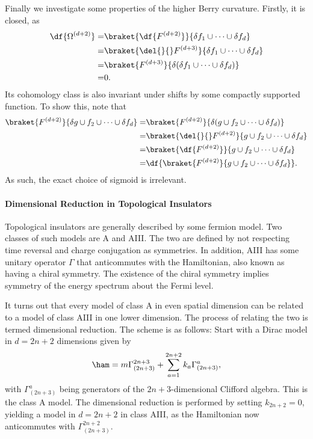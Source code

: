 Finally we investigate some properties of the higher Berry curvature. Firstly, it is closed, as
\begin{align*}
	\df{\Omega^{(d + 2)}} =& \braket{\df{F^{(d + 2)}}}{\delta f_{1}\cup\dots\cup\delta f_{d}} \\
	                      =& \braket{\del{}{}F^{(d + 3)}}{\delta f_{1}\cup\dots\cup\delta f_{d}} \\
	                      =& \braket{F^{(d + 3)}}{\delta(\delta f_{1}\cup\dots\cup\delta f_{d})} \\
	                      =& 0.
\end{align*}
Its cohomology class is also invariant under shifts by some compactly supported function. To show this, note that
\begin{align*}
	\braket{F^{(d + 2)}}{\delta g\cup f_{2}\cup\dots\cup\delta f_{d}} =& \braket{F^{(d + 2)}}{\delta(g\cup f_{2}\cup\dots\cup\delta f_{d})} \\
	=& \braket{\del{}{}F^{(d + 2)}}{g\cup f_{2}\cup\dots\cup\delta f_{d}} \\
	=& \braket{\df{F^{(d + 2)}}}{g\cup f_{2}\cup\dots\cup\delta f_{d}} \\
	=& \df{\braket{F^{(d + 2)}}{g\cup f_{2}\cup\dots\cup\delta f_{d}}}.
\end{align*}
As such, the exact choice of sigmoid is irrelevant.

\paragraph{Dimensional Reduction in Topological Insulators}
Topological insulators are generally described by some fermion model. Two classes of such models are A and AIII. The two are defined by not respecting time reversal and charge conjugation as symmetries. In addition, AIII has some unitary operator $\Gamma$ that anticommutes with the Hamiltonian, also known as having a chiral symmetry. The existence of the chiral symmetry implies symmetry of the energy spectrum about the Fermi level.

It turns out that every model of class A in even spatial dimension can be related to a model of class AIII in one lower dimension. The process of relating the two is termed dimensional reduction. The scheme is as follows: Start with a Dirac model in $d = 2n + 2$ dimensions given by
\begin{align*}
	\ham = m\Gamma_{(2n + 3)}^{2n + 3} + \sum\limits_{a = 1}^{2n + 2}k_{a}\Gamma_{(2n + 3)}^{a},
\end{align*}
with $\Gamma_{(2n + 3)}^{a}$ being generators of the $2n + 3$-dimensional Clifford algebra. This is the class A model. The dimensional reduction is performed by setting $k_{2n + 2} = 0$, yielding a model in $d = 2n + 2$ in class AIII, as the Hamiltonian now anticommutes with $\Gamma_{(2n + 3)}^{2n + 2}$.


